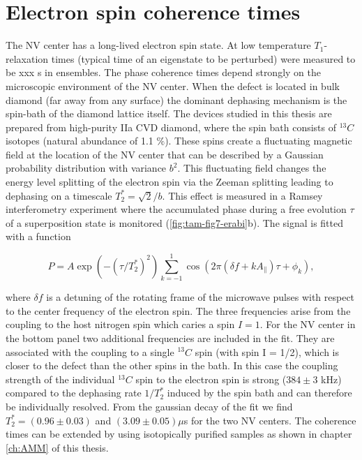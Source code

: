 \section{Electron spin coherence times}
\label{sec:elcohtimes}
The NV center has a long-lived electron spin state. At low temperature $T_1$-relaxation times (typical time of an eigenstate to be perturbed) were measured to be xxx s in ensembles. The phase coherence times depend strongly on the microscopic environment of the NV center. When the defect is located in bulk diamond (far away from any surface) the dominant dephasing mechanism is the spin-bath of the diamond lattice itself. The devices studied in this thesis are prepared from high-purity IIa CVD diamond, where the spin bath consists of $^{13}C$ isotopes (natural abundance of 1.1 $\%$). These spins create a fluctuating magnetic field at the location of the NV center that can be described by a Gaussian probability distribution with variance $b^2$. This fluctuating field changes the energy level splitting of the electron spin via the Zeeman splitting leading to dephasing on a timescale $T_2^{*} = \sqrt{2}/b$. This effect is measured in a Ramsey interferometry experiment where the accumulated phase during a free evolution $\tau$ of a superposition state is monitored (\ref{fig:tam-fig7-erabi}b). The signal is fitted with a function

\begin{equation}\label{eq:tam-ramsey}
P = A \exp(-(\tau/T_2^*)^2)\sum\limits_{k=-1}^1 \cos(2 \pi(\delta f +k A_{\parallel})\tau +\phi_k),
\end{equation}

where $\delta f$ is a detuning of the rotating frame of the microwave pulses with respect to the center frequency of the electron spin. The three frequencies arise from the coupling to the host nitrogen spin which caries a spin $I = 1$. For the NV center in the bottom panel two additional frequencies are included in the fit. They are associated with the coupling to a single $^{13}C$ spin (with spin I = 1/2), which is closer to the defect than the other spins in the bath. In this case the coupling strength of the individual $^{13}C$ spin to the electron spin is strong ($384 \pm 3$ kHz) compared to the dephasing rate $1/T_2^*$ induced by the spin bath and can therefore be individually resolved. From the gaussian decay of the fit we find $T_2^{*} = (0.96 \pm 0.03)$ and $(3.09 \pm 0.05) \mu$s for the two NV centers. The coherence times can be extended by using isotopically purified samples as shown in chapter \ref{ch:AMM} of this thesis. 

